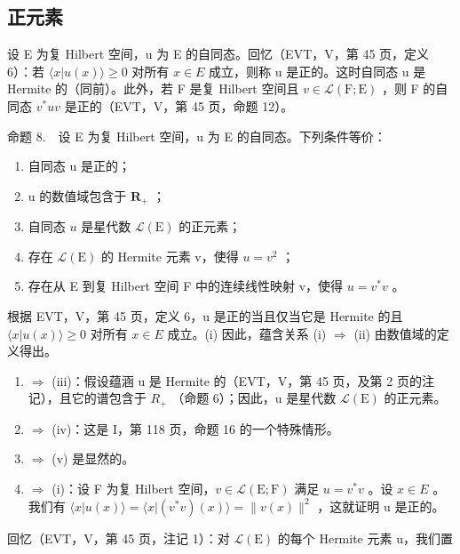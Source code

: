 \subsection{正元素}

设 E 为复 Hilbert 空间，u 为 E 的自同态。回忆（EVT，V，第 45 页，定义 6）：若 \(\langle x|u(x)\rangle\geqslant0\) 对所有 \(x\in E\) 成立，则称 u 是正的。这时自同态 u 是 Hermite 的（同前）。此外，若 F 是复 Hilbert 空间且 \(v\in\mathcal{L}(\mathrm{F};\mathrm{E})\) ，则 F 的自同态 \(v^{*}uv\) 是正的（EVT，V，第 45 页，命题 12）。

命题 8.　设 E 为复 Hilbert 空间，u 为 E 的自同态。下列条件等价：

\begin{enumerate}
\def\labelenumi{(\roman{enumi})}
\item
  自同态 u 是正的；
\item
  u 的数值域包含于 \(\mathbf{R}_{+}\) ；
\item
  自同态 \(u\) 是星代数 \(\mathcal{L}(\mathrm{E})\) 的正元素；
\item
  存在 \(\mathcal{L}(\mathrm{E})\) 的 Hermite 元素 v，使得 \(u = v^2\) ；
\item
  存在从 E 到复 Hilbert 空间 F 中的连续线性映射 v，使得 \(u = v^{*}v\) 。
\end{enumerate}

根据 EVT，V，第 45 页，定义 6，u 是正的当且仅当它是 Hermite 的且 \(\langle x|u(x)\rangle\geqslant0\) 对所有 \(x\in E\) 成立。(i) 因此，蕴含关系 (i) \(\Longrightarrow\) (ii) 由数值域的定义得出。

\begin{enumerate}
\def\labelenumi{(\roman{enumi})}
\setcounter{enumi}{1}
\item
  \(\Longrightarrow\) (iii)：假设蕴涵 u 是 Hermite 的（EVT，V，第 45 页，及第 2 页的注记），且它的谱包含于 \(R_{+}\) （命题 6）；因此，u 是星代数 \(\mathcal{L}(\mathrm{E})\) 的正元素。
\item
  \(\Longrightarrow\) (iv)：这是 I，第 118 页，命题 16 的一个特殊情形。
\item
  \(\Longrightarrow\) (v) 是显然的。
\item
  \(\Longrightarrow\) (i)：设 F 为复 Hilbert 空间，\(v \in \mathcal{L}(\mathrm{E};\mathrm{F})\) 满足 \(u = v^{*}v\) 。设 \(x \in E\) 。我们有 \(\langle x|u(x)\rangle = \langle x|(v^{*}v)(x)\rangle = \|v(x)\|^{2}\) ，这就证明 u 是正的。
\end{enumerate}

回忆（EVT，V，第 45 页，注记 1）：对 \(\mathcal{L}(\mathrm{E})\) 的每个 Hermite 元素 u，我们置

